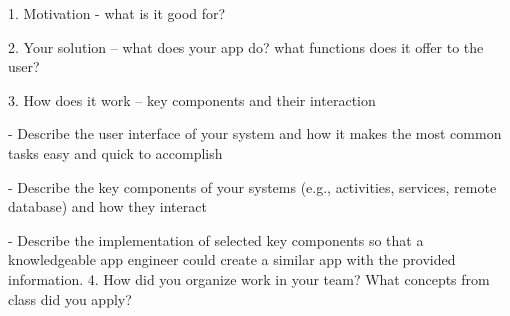 1. Motivation - what is it good for?

2. Your solution – what does your app do? what functions does it offer to the user?

3. How does it work – key components and their interaction

 - Describe the user interface of your system and how it makes the most common tasks easy and quick to accomplish

 - Describe the key components of your systems (e.g., activities, services, remote database) and how they interact

 - Describe the implementation of selected key components so that a knowledgeable app engineer could create a similar app with the provided information.
4. How did you organize work in your team? What concepts from class did you apply?
